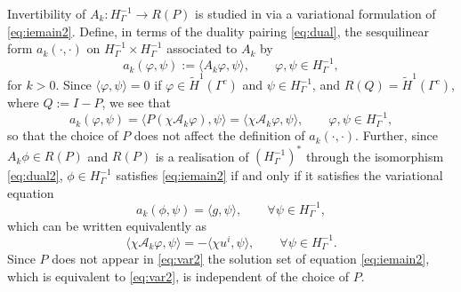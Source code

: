 \documentclass{birkjour}
\theoremstyle{definition}
\theoremstyle{remark}
\numberwithin{equation}{section}
\newcommand{\cA}{\mathcal{A}}
\begin{document}
Invertibility of $A_k:H^{-1}_\Gamma\to R(P)$ is studied in \cite{caetano2025integral} via a variational formulation of \eqref{eq:iemain2}. Define, in terms of the duality pairing \eqref{eq:dual}, the sesquilinear form $a_k(\cdot,\cdot)$ on  $H^{-1}_\Gamma \times H^{-1}_\Gamma$ associated to $A_k$ by
\begin{equation} \label{eq:sesqui}
a_k(\varphi,\psi) := \langle A_k\varphi,\psi\rangle, \qquad \varphi,\psi\in H^{-1}_\Gamma,
\end{equation}
for $k>0$. Since $\langle \varphi,\psi\rangle=0$ if $\varphi\in \widetilde H^1(\Gamma^c)$ and $\psi\in H^{-1}_\Gamma$, and $R(Q)=\widetilde H^1(\Gamma^c)$, where $Q:=I-P$, we see that
\begin{equation} \label{eq:ak2}
a_k(\varphi,\psi) = \langle P(\chi \cA_k\varphi),\psi\rangle = \langle \chi \cA_k\varphi,\psi\rangle, \qquad \varphi,\psi\in H^{-1}_\Gamma,
\end{equation}
so that the choice of $P$ does not affect the definition of $a_k(\cdot,\cdot)$.
Further, since $A_k\phi\in R(P)$ and $R(P)$ is a realisation of $(H^{-1}_\Gamma)^*$ through the isomorphism \eqref{eq:dual2}, $\phi\in H^{-1}_\Gamma$ satisfies \eqref{eq:iemain2} if and only if it satisfies the variational equation
\begin{equation} \label{eq:var1}
a_k(\phi,\psi) = \langle g,\psi\rangle, \qquad \forall \psi\in H_\Gamma^{-1},
\end{equation}
which can be written equivalently as
\begin{equation} \label{eq:var2}
\langle \chi \cA_k\varphi,\psi\rangle = -\langle \chi u^i,\psi\rangle, \qquad \forall \psi\in H_\Gamma^{-1}.
\end{equation}
Since $P$ does not appear in \eqref{eq:var2} the solution set of equation \eqref{eq:iemain2}, which is equivalent to \eqref{eq:var2}, is independent of the choice of $P$.
\end{document}
